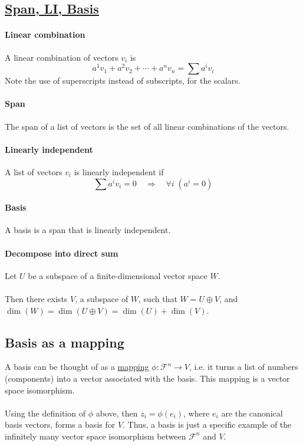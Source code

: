 \documentclass[a4paper]{article}
\begin{document}
\begin{multicols*}{4}
  \section*{\underline{Span, LI, Basis}}
    \paragraph{Linear combination} A linear combination of vectors $v_i$ is
      \[ a^1v_1+a^2v_2+\cdots+a^nv_n = \sum a^i v_i \]
      Note the use of superscripts instead of subscripts, for the scalars.
    \paragraph{Span} The span of a list of vectors is the set of all linear combinations of the vectors.
    \paragraph{Linearly independent} A list of vectors $v_i$ is linearly independent if
      \[ \sum a^iv_i = 0 \quad \Rightarrow \quad \forall i \; (a^i = 0) \]
    \paragraph{Basis} A basis is a span that is linearly independent.
    \paragraph{Decompose into direct sum} Let $U$ be a subspace of a finite-dimensional vector space $W$.
      \\\\
      Then there exists $V$, a subspace of $W$, such that \( W = U \oplus V \), and \( \dim(W) = \dim(U \oplus V) = \dim(U) + \dim(V) \).
    \subsection*{Basis as a mapping}
      A basis can be thought of as a \underline{mapping} $\phi: \mathcal{F}^n \rightarrow V$, i.e. it turns a list of numbers (components) into a vector associated with the basis. This mapping is a vector space isomorphism.
      \\\\
      Using the definition of $\phi$ above, then \( z_i = \phi(e_i) \), where $e_i$ are the canonical basis vectors, forms a basis for $V$. Thus, a basis is just a specific example of the infinitely many vector space isomorphism between $\mathcal{F}^n$ and $V$.

\end{multicols*}
\end{document}
